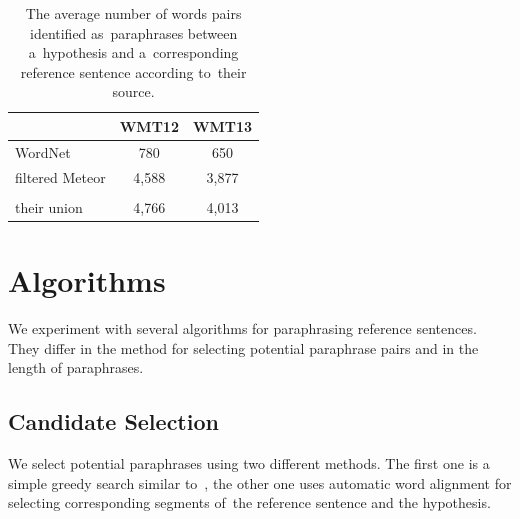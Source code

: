 


\begin{table}[t]
\begin{center}
\begin{tabular}{lcc}
& \textbf{WMT12} & \textbf{WMT13} \\
\hline
\multicolumn{1}{l|}{WordNet}      &  \multicolumn{1}{c|}{780} & 650 \\
\multicolumn{1}{l|}{filtered Meteor}   & \multicolumn{1}{c|}{4,588} & 3,877 \\
\hline
\multicolumn{3}{c}{} \\[-14pt]
\hline
\multicolumn{1}{l|}{their union}       & \multicolumn{1}{c|}{4,766} & 4,013 \\
\end{tabular}
\caption{The average number of words pairs identified as~paraphrases between 
a~hypothesis and a~corresponding reference sentence according to~their source.}
\label{number_of_substitutions}
\end{center}
\end{table}


\section{Algorithms}
\label{algorithm}
We experiment with several algorithms for paraphrasing reference sentences. 
They differ in the method for selecting potential paraphrase pairs and in the 
length of paraphrases.

\subsection{Candidate Selection}
\label{candidates}
We select potential paraphrases using two different methods. The first one is a 
simple greedy search similar to~\citet{kauchak}, the other one uses automatic word
alignment for selecting corresponding segments of~the reference sentence and the 
hypothesis.


